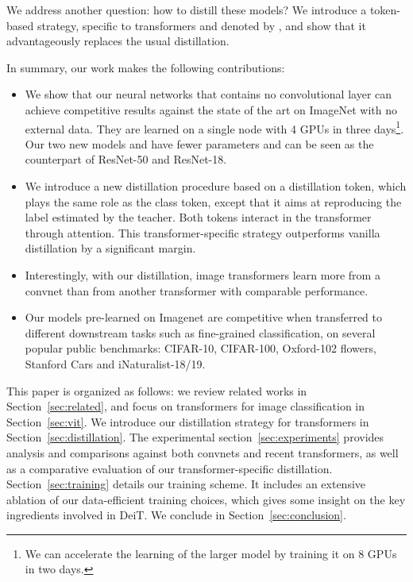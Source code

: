 We address another question: how to distill these models? 
We introduce a token-based strategy, specific to transformers and denoted by \oursdis, and show that it advantageously replaces the usual distillation. 

In summary, our work makes the following contributions: 
\begin{itemize}
    \item We show that our neural networks that contains no convolutional layer can achieve competitive results against the state of the art on ImageNet with no external data. 
    They are learned on a single node with 4 GPUs in three days\footnote{We can accelerate the learning of the larger model \oursbase by training it on 8 GPUs in two days.}. %
    Our two new models \ourssmall and \ourstiny have fewer parameters and can be seen as the counterpart of ResNet-50 and ResNet-18. 
    \item We introduce a new distillation procedure based on a distillation token, which plays the same role as the class token, except that it aims at reproducing the label estimated by the teacher. Both tokens interact in the transformer through attention. %
    This transformer-specific strategy outperforms  vanilla distillation by a significant margin. 
    \item 
    Interestingly, with our distillation, image  transformers learn more from a convnet than from another transformer with comparable performance. 
    \item Our models pre-learned on Imagenet are competitive when transferred to different downstream tasks such as fine-grained classification, on several popular public benchmarks: CIFAR-10, CIFAR-100, Oxford-102 flowers, Stanford Cars and iNaturalist-18/19. 
%
\end{itemize}

This paper is organized as follows: we  review related works in Section~\ref{sec:related}, and focus on transformers for image classification in Section~\ref{sec:vit}. %
We introduce our distillation strategy for transformers in Section~\ref{sec:distillation}. 
The experimental section~\ref{sec:experiments} provides analysis and  comparisons against both convnets and recent transformers, as well as a comparative evaluation of our transformer-specific distillation. 
Section~\ref{sec:training} details our training scheme.  
%
It includes an extensive ablation of our data-efficient training choices, which gives some insight on the key ingredients involved in DeiT. 
We conclude in Section~\ref{sec:conclusion}. 